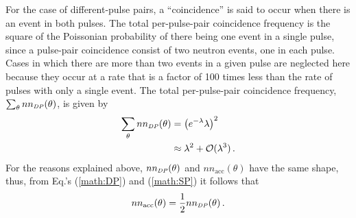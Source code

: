 For the case of different-pulse pairs, a ``coincidence'' is said to occur when there is an event in both pulses.
The total per-pulse-pair coincidence frequency is the square of the Poissonian probability of there being one event in a single pulse, since a pulse-pair coincidence consist of two neutron events, one in each pulse.
Cases in which there are more than two events in a given pulse are neglected here because they occur at a rate that is a factor of 100 times less than the rate of pulses with only a single event.
The total per-pulse-pair coincidence frequency, $\sum_{\theta} nn_{\scaleto{DP}{4pt}}(\theta)$, is given by 
\begin{equation} \label{math:DP}
    \begin{split}
   \sum_{\theta} nn_{\scaleto{DP}{4pt}}(\theta)&= \left(e^{-\lambda}\lambda\right)^{2} \\
    &\approx \lambda^2 + \mathcal{O}(\lambda^3) \, .
    \end{split}
\end{equation}
For the reasons explained above, $nn_{\scaleto{DP}{4pt}}(\theta)$ and $nn_{\text{acc}}(\theta)$ have the same shape, thus, from Eq.'s (\ref{math:DP}) and (\ref{math:SP}) it follows that 
\begin{equation}
\label{eq:uncorr_DP}
nn_{\text{acc}}(\theta) = \frac{1}{2}nn_{\scaleto{DP}{4pt}}(\theta) \,.
\end{equation}

